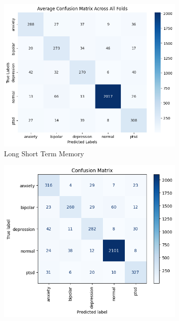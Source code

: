 \pagebreak

\vspace{-2cm}

\begin{figure}[H]
    \centering
    \begin{subfigure}[b]{0.49\textwidth}
        \centering
        \includegraphics[width=\textwidth]{Images/LSTM Confusion Matrix.png}
        \caption*{Long Short Term Memory}
        \label{LSTMCM}  %
    \end{subfigure}
    \hfill
    \begin{subfigure}[b]{0.49\textwidth}
        \centering
        \includegraphics[width=\textwidth]{Images/T CM.png}

\end{subfigure}
\end{figure}
